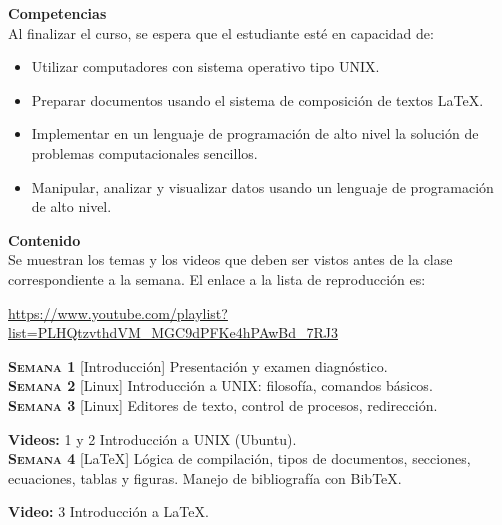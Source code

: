 \documentclass[letterpaper,10pt,onecolumn]{article}
\begin{document}
\noindent\textbf{\large {} \quad Competencias}\\[-0.2cm]

\noindent\normalsize Al finalizar el curso, se espera que el estudiante esté en capacidad de:

\begin{itemize}
	\item Utilizar computadores con sistema operativo tipo UNIX.\\[-0.6cm]
	\item Preparar documentos usando el sistema de composición de textos \LaTeX.\\[-0.6cm]
	\item Implementar en un lenguaje de programación de alto nivel la solución de problemas computacionales sencillos.\\[-0.6cm]
	\item Manipular, analizar y visualizar datos usando un lenguaje de programación de alto nivel.\\[-0.2cm]
\end{itemize}

\noindent\textbf{\large {} \quad Contenido}\\[-0.2cm]

Se muestran los temas y los videos que deben ser vistos antes de la clase correspondiente a la semana. El enlace a la lista de reproducci\'on es:

\url{https://www.youtube.com/playlist?list=PLHQtzvthdVM_MGC9dPFKe4hPAwBd_7RJ3}

\noindent\normalsize \textbf{\textsc{Semana 1}} [Introducción]
Presentación y examen diagnóstico.
\\[-0.3cm] 

\noindent\textbf{\textsc{Semana 2}} [Linux]
Introducción a UNIX: filosofía, comandos básicos.
\\[-0.3cm] 

\noindent\textbf{\textsc{Semana 3}}  [Linux] Editores de texto, control de procesos, redirección.

\textbf{Videos:} 1 y 2 Introducci\'on a UNIX (Ubuntu).
\\[-0.3cm]  

\noindent\textbf{\textsc{Semana 4}} [\LaTeX] Lógica de
compilación, tipos de documentos, secciones, ecuaciones, tablas y
figuras. Manejo de bibliografía con BibTeX.

\textbf{Video:} 3 Introducci\'on a \LaTeX.
\\[-0.3cm]   
\end{document}
